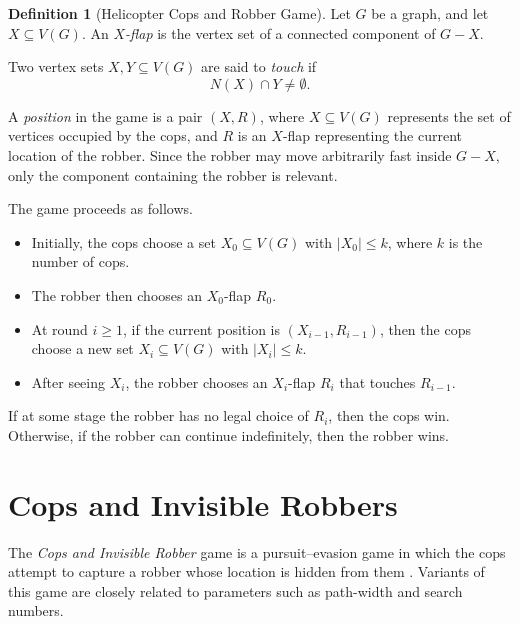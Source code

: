\documentclass[10pt]{book}
\theoremstyle{definition}
\newtheorem{definition}[theorem]{Definition}
\begin{document}
\begin{definition}[Helicopter Cops and Robber Game]
\cite{seymour1993graph}
Let \(G\) be a graph, and let \(X\subseteq V(G)\).  
An \emph{\(X\)-flap} is the vertex set of a connected component of \(G-X\).

Two vertex sets \(X,Y\subseteq V(G)\) are said to \emph{touch} if
\[
N(X)\cap Y\neq \emptyset.
\]

A \emph{position} in the game is a pair \((X,R)\), where \(X\subseteq V(G)\) represents the set of vertices occupied by the cops, and \(R\) is an \(X\)-flap representing the current location of the robber.  
Since the robber may move arbitrarily fast inside \(G-X\), only the component containing the robber is relevant.

The game proceeds as follows.
\begin{itemize}
    \item Initially, the cops choose a set \(X_0\subseteq V(G)\) with \(|X_0|\leq k\), where \(k\) is the number of cops.
    \item The robber then chooses an \(X_0\)-flap \(R_0\).
    \item At round \(i\geq 1\), if the current position is \((X_{i-1},R_{i-1})\), then the cops choose a new set \(X_i\subseteq V(G)\) with \(|X_i|\leq k\).
    \item After seeing \(X_i\), the robber chooses an \(X_i\)-flap \(R_i\) that touches \(R_{i-1}\).
\end{itemize}

If at some stage the robber has no legal choice of \(R_i\), then the cops win.  
Otherwise, if the robber can continue indefinitely, then the robber wins.
\end{definition}

\section{Cops and Invisible Robbers}

The \emph{Cops and Invisible Robber} game is a pursuit--evasion game in which the cops attempt to capture a robber whose location is hidden from them \cite{dereniowski2015zero,kehagias2013cops,richerby2009graph,clarke2020limited}.  
Variants of this game are closely related to parameters such as path-width and search numbers.
\end{document}
